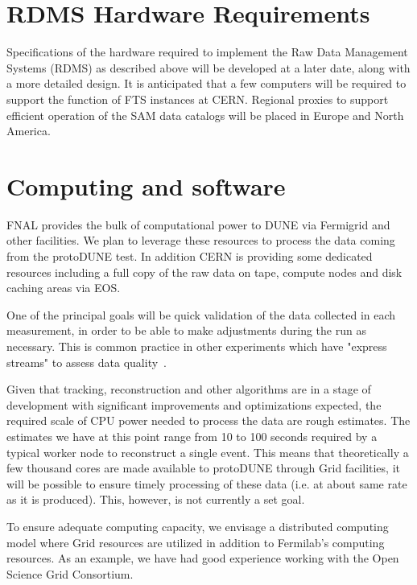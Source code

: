 \documentclass[12pt]{article}
\begin{document}
{\section{RDMS Hardware Requirements}
Specifications of the hardware required to implement the Raw Data Management Systems (RDMS) as described above will be developed at a later date,
along with a more detailed design. It is anticipated that a few computers will be required to support the function of FTS instances at CERN.
Regional proxies to support efficient operation of the SAM data catalogs will be placed in Europe and North America.

\section{Computing and software}


FNAL provides the bulk of computational power to DUNE via Fermigrid and other facilities. 
We plan to leverage these resources to process the data coming from the protoDUNE test. In addition CERN is providing some dedicated resources including a full copy of the raw data on tape, compute nodes and disk caching areas via EOS.

One of the principal goals will be quick validation of the data collected in each measurement, in
order to be able to make adjustments during the run as necessary. 
This is common practice in other experiments which have "express streams" to assess data quality~\cite{atlas_express}.


Given that tracking, reconstruction and other algorithms are in a stage of development with significant improvements
and optimizations expected, the required scale of CPU power needed to process the data are rough estimates.
The estimates we have at this point range from 10 to 100 seconds required by a typical worker node to reconstruct
a single event.  This means that theoretically a few thousand cores are made available to protoDUNE through Grid facilities,
it will be possible to ensure timely processing of these data (i.e. at about same rate as it is produced). This, however, is not
currently a set goal.

To ensure adequate computing capacity, we envisage a distributed computing model where Grid resources are
utilized in addition to Fermilab's computing resources. As an example, we have had good experience working
with the Open Science Grid Consortium.


}
\end{document}
